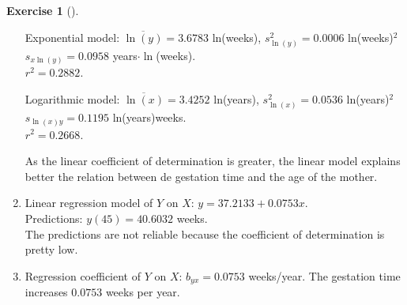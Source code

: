 \documentclass[
  a4paper,
]{scrreport}
\theoremstyle{definition}
\newtheorem{exercise}{Exercise}[chapter]
\theoremstyle{remark}
\begin{document}
\begin{exercise}[]
\begin{tcolorbox}
\begin{enumerate}
  Exponential model: \(\overline{\ln(y)} = 3.6783\) ln(weeks),
  \(s_{\ln(y)}^2 = 0.0006\) ln(weeks)\(^2\)\\
  \(s_{x\ln(y)} = 0.0958\) years\(\cdot\ln\)(weeks).\\
  \(r^2 = 0.2882\).

  Logarithmic model: \(\overline{\ln(x)} = 3.4252\) ln(years),
  \(s_{\ln(x)}^2 = 0.0536\) ln(years)\(^2\)\\
  \(s_{\ln(x)y} = 0.1195\) ln(years)weeks.\\
  \(r^2 = 0.2668\).

  As the linear coefficient of determination is greater, the linear
  model explains better the relation between de gestation time and the
  age of the mother.
\item
  Linear regression model of \(Y\) on \(X\):
  \(y = 37.2133 + 0.0753 x\).\\
  Predictions: \(y(45) = 40.6032\) weeks.\\
  The predictions are not reliable because the coefficient of
  determination is pretty low.
\item
  Regression coefficient of \(Y\) on \(X\): \(b_{yx} = 0.0753\)
  weeks/year. The gestation time increases \(0.0753\) weeks per year.
\end{enumerate}

\end{tcolorbox}

\end{exercise}
\end{document}
